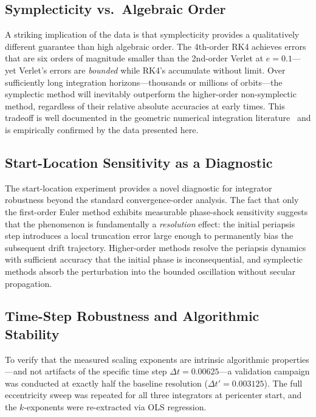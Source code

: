 \documentclass[twocolumn, 10pt]{article}
\begin{document}
\subsection{Symplecticity vs.\ Algebraic Order}

A striking implication of the data is that symplecticity provides a qualitatively different guarantee than high algebraic order. The 4th-order RK4 achieves errors that are six orders of magnitude smaller than the 2nd-order Verlet at $e = 0.1$---yet Verlet's errors are \textit{bounded} while RK4's accumulate without limit. Over sufficiently long integration horizons---thousands or millions of orbits---the symplectic method will inevitably outperform the higher-order non-symplectic method, regardless of their relative absolute accuracies at early times. This tradeoff is well documented in the geometric numerical integration literature~\cite{kinoshita1991, rein2019} and is empirically confirmed by the data presented here.

\subsection{Start-Location Sensitivity as a Diagnostic}

The start-location experiment provides a novel diagnostic for integrator robustness beyond the standard convergence-order analysis. The fact that only the first-order Euler method exhibits measurable phase-shock sensitivity suggests that the phenomenon is fundamentally a \textit{resolution} effect: the initial periapsis step introduces a local truncation error large enough to permanently bias the subsequent drift trajectory. Higher-order methods resolve the periapsis dynamics with sufficient accuracy that the initial phase is inconsequential, and symplectic methods absorb the perturbation into the bounded oscillation without secular propagation.

\subsection{Time-Step Robustness and Algorithmic Stability}
\label{sec:robustness}

To verify that the measured scaling exponents are intrinsic algorithmic properties---and not artifacts of the specific time step $\Delta t = 0.00625$---a validation campaign was conducted at exactly half the baseline resolution ($\Delta t' = 0.003125$). The full eccentricity sweep was repeated for all three integrators at pericenter start, and the $k$-exponents were re-extracted via OLS regression.
\end{document}
